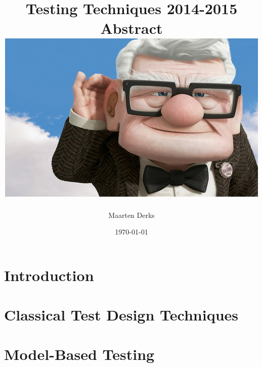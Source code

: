 \documentclass[a4paper]{report}
\title{{Testing Techniques 2014-2015}\\
	   {\large Abstract}\\
       {\includegraphics{up.jpg}}
}
\author{Maarten Derks}
\date{\today}
\begin{document}
	
	\maketitle
	
	\tableofcontents
	
	\chapter{Introduction}
		
	
	\chapter{Classical Test Design Techniques}
			
	
	\chapter{Model-Based Testing}
\end{document}
